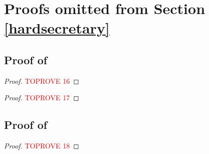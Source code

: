 \documentclass[11pt, a4paper, twoside]{article}
\numberwithin{equation}{section}
\begin{document}
        \section{Proofs omitted from Section \ref{hardsecretary}}\label{supphardsecretary}
        
        \subsection{Proof of }\label{supphardsecretarylem}
        \begin{proof}\textcolor{red}{TOPROVE 16}\end{proof}
 
    \begin{proof}\textcolor{red}{TOPROVE 17}\end{proof}
	
	\subsection{Proof  of }\label{supphardsecretaryprop}
    \begin{proof}\textcolor{red}{TOPROVE 18}\end{proof}
    
\end{document}
